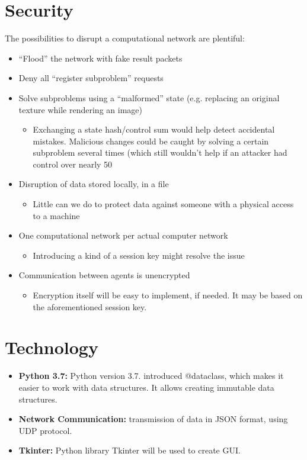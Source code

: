 \documentclass{article}
\begin{document}
\section{Security}
The possibilities to disrupt a computational network are plentiful:
\begin{itemize}
    \item “Flood” the network with fake result packets
    \item Deny all “register subproblem” requests
    \item Solve subproblems using a “malformed” state (e.g. replacing an original texture while rendering an image)
    \begin{itemize}
        \item Exchanging a state hash/control sum would help detect accidental mistakes. Malicious changes could be caught by solving a certain subproblem 
        several times (which still wouldn’t help if an attacker had control over nearly 50%
    \end{itemize}
    \item Disruption of data stored locally, in a file
    \begin{itemize}
        \item Little can we do to protect data against someone with a physical access to a machine
    \end{itemize}
    \item One computational network per actual computer network
    \begin{itemize}
        \item Introducing a kind of a session key might resolve the issue
    \end{itemize}
    \item Communication between agents is unencrypted
    \begin{itemize}
        \item Encryption itself will be easy to implement, if needed. It may be based on the aforementioned session key.
    \end{itemize}
\end{itemize}

\section{Technology}
\begin{itemize}
    \item \textbf{Python 3.7:} Python version 3.7. introduced @dataclass, which makes it easier to work with data structures.
    It allows creating immutable data structures.
    \item \textbf{Network Communication:} transmission of data in JSON format, using UDP protocol.
    \item \textbf{Tkinter:} Python library Tkinter will be used to create GUI.
\end{itemize}
\end{document}
